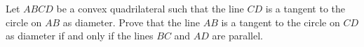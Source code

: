 
\begin{exercise}[4/1984]
    Let $ABCD$ be a convex quadrilateral such that the line $CD$ is a tangent to the circle on $AB$ as diameter.
    Prove that the line $AB$ is a tangent to the circle on $CD$ as diameter if and only if the lines $BC$ and $AD$ are parallel.
\end{exercise}
